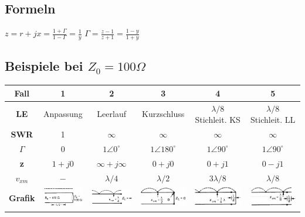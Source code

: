 \subsection{Formeln}
	$z=r+jx=\frac{1+\Gamma}{1-\Gamma}=\frac{1}{y}$ \qquad
	$\Gamma=\frac{z-1}{z+1}=\frac{1-y}{1+y}$
	
\subsection{Beispiele bei $Z_0=100\Omega$}
		\renewcommand{\arraystretch}{1.1}
		\begin{tabular}{| c | c | c | c | c | c |}
			\hline
				\textbf{Fall}
				& 1
				& 2 
				& 3
				& 4
				& 5 \\
			\hline
				\textbf{LE}
				& Anpassung
				& Leerlauf
				& Kurzschluss
				& $\lambda/8$ Stichleit. KS
				& $\lambda/8$ Stichleit. LL \\
			\hline
				\textbf{SWR}
				& 1
				& $\infty$
				& $\infty$
				& $\infty$
				& $\infty$ \\
			\hline
				\textbf{$\Gamma$}
				& $0$
				& $1 \angle 0 ^\circ$
				& $1 \angle 180 ^\circ$
				& $1 \angle 90 ^\circ$
				& $1 \angle 90 ^\circ$\\
			\hline
				\textbf{z}
				& $1+j0$
				& $\infty+j\infty$
				& $0+j0$
				& $0+j1$
				& $0-j1$ \\
			\hline
				\textbf{$v_{xm}$}
				& $-$
				& $\lambda/4$
				& $\lambda/2$
				& $3\lambda/8$
				& $\lambda/8$ \\
			\hline
				\textbf{Grafik}
				& \includegraphics[height=0.9cm]{./images/Fall1.png}
				& \includegraphics[height=0.9cm]{./images/Fall2.png}
				& \includegraphics[height=0.9cm]{./images/Fall3.png}
				& \includegraphics[height=0.9cm]{./images/Fall4.png}
				& \includegraphics[height=0.9cm]{./images/Fall5.png} \\
			\hline
		\end{tabular}
		\renewcommand{\arraystretch}{1}
		